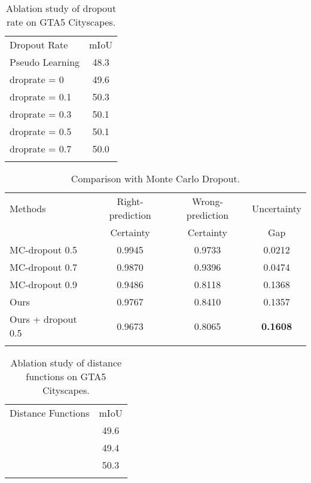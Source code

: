 \setlength{\tabcolsep}{20pt}
\begin{table}
\small
\begin{center}
\begin{tabular}{l|c}
\shline
Dropout Rate & mIoU \\
\shline
Pseudo Learning & 48.3 \\
\hline
droprate = 0 & 49.6 \\
droprate = 0.1  & 50.3 \\
droprate = 0.3  & 50.1 \\
droprate = 0.5  & 50.1 \\
droprate = 0.7  & 50.0 \\
\shline
\end{tabular}
\end{center}
\caption{Ablation study of dropout rate on GTA5  Cityscapes.}
\label{table:dropout}
\end{table}

\setlength{\tabcolsep}{7pt}
\begin{table}
\scriptsize
\begin{center}
\begin{tabular}{l|c|c|c}
\shline
Methods & Right-prediction & Wrong-prediction & Uncertainty \\
& Certainty & Certainty & Gap\\
\shline
MC-dropout 0.5 & 0.9945 & 0.9733 & 0.0212 \\
MC-dropout 0.7 & 0.9870 & 0.9396 & 0.0474 \\
MC-dropout 0.9 & 0.9486 & 0.8118 & 0.1368 \\
\hline
Ours & 0.9767 & 0.8410 & 0.1357 \\
Ours + dropout 0.5 & 0.9673 & 0.8065 & \textbf{0.1608} \\
\shline
\end{tabular}
\end{center}
\caption{Comparison with Monte Carlo Dropout.}
\label{table:mc-drop}
\end{table}

\setlength{\tabcolsep}{15pt}
\begin{table}
\footnotesize
\begin{center}
\begin{tabular}{l|c}
\shline
Distance Functions & mIoU \\
\shline
 & 49.6 \\
 & 49.4 \\
\hline
 & 50.3 \\
\shline
\end{tabular}
\end{center}
\caption{Ablation study of distance functions on GTA5  Cityscapes.}
\label{table:function}
\end{table}

